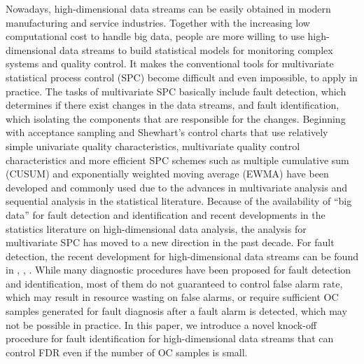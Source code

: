 \documentclass[]{interact}
\theoremstyle{plain}%
\theoremstyle{definition}
\theoremstyle{remark}
\begin{document}
Nowadays, high-dimensional data streams can be easily obtained in modern manufacturing and service industries. Together with the increasing low computational cost to handle big data, people are more willing to use high-dimensional data streams to build statistical models for monitoring complex systems and quality control. It makes the conventional tools for multivariate statistical process control (SPC) become difficult and even impossible, to apply in practice. The tasks of multivariate SPC basically include fault detection, which determines if there exist changes in the data streams, and fault identification, which isolating the components that are responsible for the changes. Beginning with acceptance sampling and Shewhart’s control charts that use relatively simple univariate quality characteristics, multivariate quality control characteristics and more efficient SPC schemes such as multiple cumulative sum (CUSUM) and exponentially weighted moving average (EWMA) have been developed and commonly used due to the advances in multivariate analysis and sequential analysis in the statistical literature. Because of the availability of “big data” for fault detection and identification and recent developments in the statistics literature on high-dimensional data analysis, the analysis for multivariate SPC has moved to a new direction in the past decade. For fault detection, the recent development for high-dimensional data streams can be found in \cite{woodall2014some}, \cite{zou2015efficient}, \cite{xian2018nonparametric}. While many diagnostic procedures have been proposed for fault detection and identification, most of them do not guaranteed to control false alarm rate, which may result in resource wasting on false alarms, or require sufficient OC samples generated for fault diagnosis after a fault alarm is detected, which may not be possible in practice. In this paper, we introduce a novel knock-off procedure for fault identification for high-dimensional data streams that can control FDR even if the number of OC samples is small.
\end{document}
